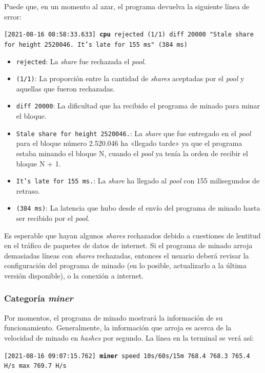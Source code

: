\documentclass[12pt,a4paper,twoside]{book}
\begin{document}
Puede que, en un momento al azar, el programa devuelva la siguiente línea de error:

{\footnotesize \texttt{[2021-08-16 08:58:33.633] \textbf{cpu} rejected (1/1) diff 20000 "Stale share \smallbreak for height 2520046. It's late for 155 ms" (384 ms)}}

\begin{itemize}
\item \texttt{rejected}: La \textit{share} fue rechazada el \textit{pool}.
\item \texttt{(1/1)}: La proporción entre la cantidad de \textit{shares} aceptadas por el \textit{pool} y aquellas que fueron rechazadas.
\item \texttt{diff 20000}: La dificultad que ha recibido el programa de minado para minar el bloque.
\item \texttt{Stale share for height 2520046.}: La \textit{share} que fue entregado en el \textit{pool} para el bloque número 2.520.046 ha «llegado tarde» ya que el programa estaba minando el bloque N, cuando el \textit{pool} ya tenía la orden de recibir el bloque N + 1.
\item \texttt{It's late for 155 ms.}: La \textit{share} ha llegado al \textit{pool} con 155 milisegundos de retraso.
\item \texttt{(384 ms)}: La latencia que hubo desde el envío del programa de minado hasta ser recibido por el \textit{pool}.
\end{itemize}

Es esperable que hayan algunos \textit{shares} rechazados debido a cuestiones de lentitud en el tráfico de paquetes de datos de internet. Si el programa de minado arroja demasiadas líneas con \textit{shares} rechazadas, entonces el usuario deberá revisar la configuración del programa de minado (en lo posible, actualizarlo a la última versión disponible), o la conexión a internet.

\subsubsection{Categoría \textit{miner}}
Por momentos, el programa de minado mostrará la información de su funcionamiento. Generalmente, la información que arroja es acerca de la velocidad de minado en \textit{hashes} por segundo. La línea en la terminal se verá así:

{\scriptsize \texttt{[2021-08-16 09:07:15.762] \textbf{miner} speed 10s/60s/15m 768.4 768.3 765.4 H/s max 769.7 H/s}}
\end{document}

